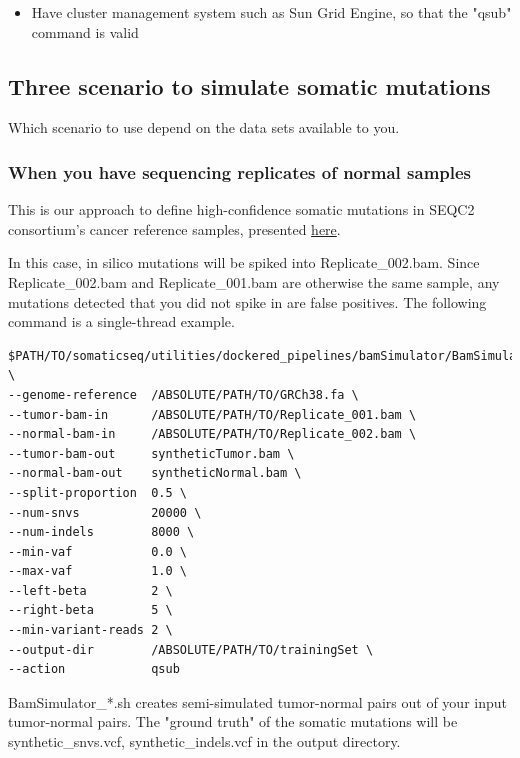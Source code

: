 \documentclass[10pt,letterpaper]{article}
\begin{document}
\begin{sloppypar}
\begin{itemize}
  \item Have cluster management system such as Sun Grid Engine, so that the "qsub" command is valid

\end{itemize}





\subsection{Three scenario to simulate somatic mutations}

Which scenario to use depend on the data sets available to you.


\subsubsection{When you have sequencing replicates of normal samples}

This is our approach to define high-confidence somatic mutations in SEQC2 consortium's cancer reference samples, presented \href{https://dx.doi.org/10.1158/1538-7445.AM2018-432}{here}.

In this case, in silico mutations will be spiked into Replicate\_002.bam. Since Replicate\_002.bam and Replicate\_001.bam are otherwise the same sample, any mutations detected that you did not spike in are false positives. The following command is a single-thread example.


\begin{lstlisting}
$PATH/TO/somaticseq/utilities/dockered_pipelines/bamSimulator/BamSimulator_singleThread.sh \
--genome-reference  /ABSOLUTE/PATH/TO/GRCh38.fa \
--tumor-bam-in      /ABSOLUTE/PATH/TO/Replicate_001.bam \
--normal-bam-in     /ABSOLUTE/PATH/TO/Replicate_002.bam \
--tumor-bam-out     syntheticTumor.bam \
--normal-bam-out    syntheticNormal.bam \
--split-proportion  0.5 \
--num-snvs          20000 \
--num-indels        8000 \
--min-vaf           0.0 \
--max-vaf           1.0 \
--left-beta         2 \
--right-beta        5 \
--min-variant-reads 2 \
--output-dir        /ABSOLUTE/PATH/TO/trainingSet \
--action            qsub
\end{lstlisting}



BamSimulator\_*.sh creates semi-simulated tumor-normal pairs out of your input tumor-normal pairs. The "ground truth" of the somatic mutations will be synthetic\_snvs.vcf, synthetic\_indels.vcf in the output directory.


\end{sloppypar}
\end{document}
